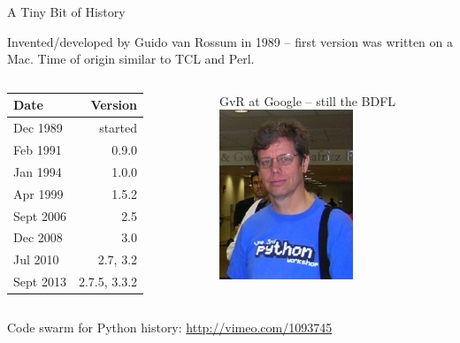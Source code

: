 \documentclass{beamer}
\begin{document}
\begin{frame}{A Tiny Bit of History}

Invented/developed by Guido van Rossum in 1989 -- first version was written on
a Mac. Time of origin similar to TCL and Perl.

   \begin{columns}[t] %
     \begin{column}[T]{4.5cm} %
        \begin{tabular}[pos]{lr}
             Date   	  &  Version \\
            \hline
            Dec 1989   	&   started \\
            Feb 1991    &	  0.9.0 \\
            Jan 1994    &   1.0.0 \\
            Apr 1999		&   1.5.2 \\	
            Sept 2006	  &   2.5 \\
            Dec 2008	  &   3.0 \\
            Jul 2010    &   2.7, 3.2 \\
            Sept 2013   &   2.7.5, 3.3.2
        \end{tabular}
     \end{column}
     \begin{column}[T]{5.5cm} %
          GvR at Google -- still the BDFL \\
          \includegraphics[height=2.0in]{GvR.jpg}
     \end{column}
   \end{columns}
Code swarm for Python history: \url{http://vimeo.com/1093745}

\end{frame} 
\end{document}
